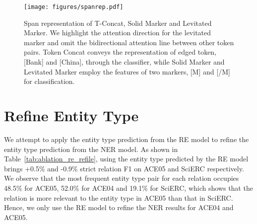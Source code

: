 \documentclass[11pt]{article}
\newcommand\blarge{\xspace}
\newcommand\xxlarge{\xspace}
\newcommand\Ourmodel{PL-Marker\xspace}
\begin{document}
\begin{figure}[!t]
    \centering
    \texttt{[image: figures/spanrep.pdf]}
    \caption{
     Span representation  of T-Concat, Solid Marker and Levitated Marker. We highlight the attention direction for the levitated marker and omit the bidirectional attention line between other token pairs.  Token Concat conveys the representation of edged token, [Bank] and [China], through the classifier, while Solid Marker and Levitated Marker employ the features of two markers, [M] and [/M]  for classification.
    }
    \label{fig:spanrep}
\end{figure}

\begin{table}[!t]
 \caption{The entity F1 on test set of NER datasets when the \Ourmodel is initialized with prompt or when it is initialized randomly. We use the RoBERTa\blarge for flat NER datasets and ALBERT\xxlarge for the nested NER datasets. }
 
 \label{tab:ablation_ner}
\end{table}

\section{Refine Entity Type}

We  attempt to apply the entity type prediction from  the RE model to refine the entity type prediction from  the NER model. As shown in  Table~\ref{tab:ablation_re_refile}, using the entity type predicted by the RE model brings +0.5\% and -0.9\% strict relation F1 on ACE05 and SciERC respectively. We observe that the most frequent entity type pair for each relation occupies 48.5\%  for ACE05, 52.0\% for ACE04 and 19.1\% for SciERC, which shows that the relation is more relevant to the entity type in ACE05 than that in SciERC. Hence,  we only use the RE model to refine the NER results for ACE04 and ACE05.
\end{document}
